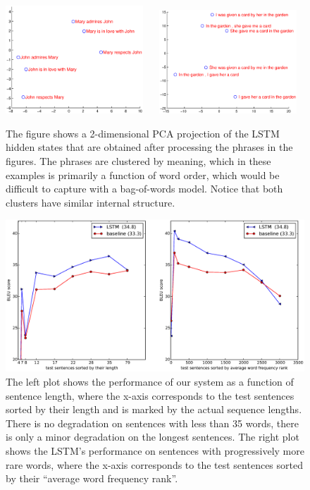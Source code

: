\begin{figure}[h!]
\centering
\includegraphics[width=0.46\textwidth]{figure2} ~~
\includegraphics[width=0.46\textwidth]{figure3} 
\caption{\small The figure shows a 2-dimensional PCA projection of the
  LSTM hidden states that are obtained after processing the phrases in
  the figures.  The phrases are clustered by meaning, which in these
  examples is primarily a function of word order, which would be
  difficult to capture with a bag-of-words model. Notice that both
  clusters have similar internal structure.}
\label{fig:embedding}
\end{figure}

\begin{figure}[h!]
\centerline{
\includegraphics[width=1.\textwidth]{good2.eps} }  
\caption{\small The left plot shows the performance of our system as a
  function of sentence length, where the x-axis corresponds to the
  test sentences sorted by their length and is marked by the actual
  sequence lengths.  There is no degradation on sentences with less
  than 35 words, there is only a minor degradation on the longest
  sentences.  The right plot shows the LSTM's performance on sentences
  with progressively more rare words, where the x-axis corresponds to
  the test sentences sorted by their ``average word frequency rank''.
}
\label{fig:oriol}
\end{figure}

